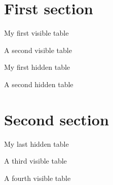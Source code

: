\documentclass%
  [oneside,a4paper]{article}
\begin{document}
\listoftables
\section{First section}
\sectlot
\lipsum[1]
\begin{table}[hb]
\caption{My first visible table}
\end{table}
\lipsum[2]
\begin{table}[ht]
\caption{A second visible table}
\end{table}
\lipsum[3]
\begin{table}[hb]
\mtchideinmainlot
\caption{My first hidden table}
\end{table}
\lipsum[4-6]
\begin{table}[ht]
\caption{A second hidden table}
\end{table}
\lipsum[7]
\section{Second section}
\sectlot
\lipsum[8]
\begin{table}[hb]
\caption{My last hidden table}
\endmtchideinmainlot
\end{table}
\lipsum[9]
\begin{table}[ht]
\caption{A third visible table}
\end{table}
\lipsum[10]
\begin{table}[hb]
\caption{A fourth visible table}
\end{table}
\lipsum[11]
\end{document}
